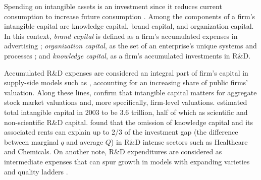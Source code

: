 \documentclass[12pt, letterpaper]{article}
\begin{document}
Spending on intangible assets is an investment since it reduces current consumption to increase future consumption \citep{Corrado2009-kd, Corrado2009-hk}. Among the components of a firm's intangible capital are knowledge capital, brand capital, and organization capital.  In this context, \emph{brand capital} is defined as a firm's accumulated expenses in advertising \citep{Belo2019-iz}; \emph{organization capital}, as the set of an enterprise's unique systems and processes %
\citep{Eisfeldt2013-ad, Bloom2007-gl}; and \emph{knowledge capital}, as a firm's accumulated investments in R\&D.

Accumulated R\&D expenses are considered an integral part of firm's capital in supply-side models such as \cite{Belo2013-ys}, accounting for an increasing share of public firms' valuation. Along these lines, \cite{Hall2001-ni, McGrattan2001-kc, Vitorino2014-yd, Eisfeldt2020-ec, Li2014-zp} confirm that intangible capital matters for aggregate stock market valuations and, more specifically, firm-level valuations. \cite{Corrado2009-kd} estimated total intangible capital in 2003 to be 3.6 trillion, half of which as scientific and non-scientific R\&D capital. \cite{Crouzet2022-ic} found that the omission of knowledge capital and its associated rents can explain up to 2/3 of the investment gap (the difference between marginal $q$ and average $Q$) in R\&D intense sectors such as Healthcare and Chemicals. On another note, R\&D expenditures are considered as intermediate expenses that can spur growth in models with expanding varieties \citep{Romer1990-tw} and quality ladders \citep{Grossman1991-pz, Atkeson2019-wz}.



\end{document}

